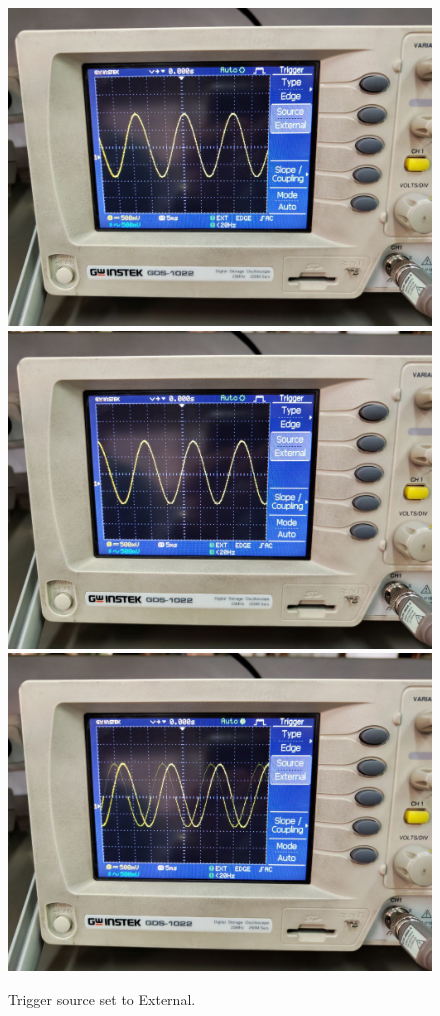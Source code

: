 \documentclass[11pt]{article}
\begin{document}
\begin{question}
{        \begin{figure}[H]
            \begin{center}
                \includegraphics[scale=0.1]{Fig/39.jpeg}
                \includegraphics[scale=0.1]{Fig/40.jpeg}
                \includegraphics[scale=0.1]{Fig/41.jpeg}
                \caption{Trigger source set to External.}
            \end{center}
        \end{figure}

}
\end{question}
\end{document}
